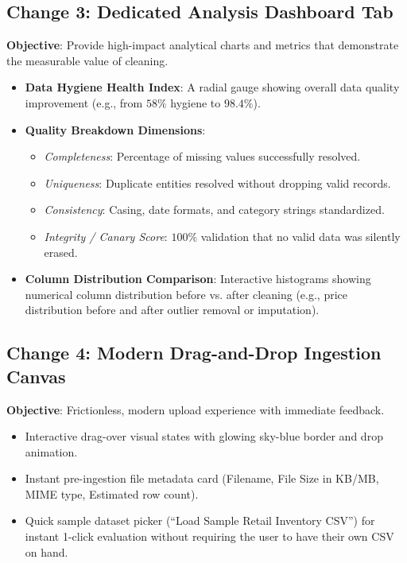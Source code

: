 \documentclass[11pt,a4paper]{article}
\begin{document}
\subsection{Change 3: Dedicated Analysis Dashboard Tab}
\textbf{Objective}: Provide high-impact analytical charts and metrics that demonstrate the measurable value of cleaning.
\begin{itemize}[leftmargin=*]
    \item \textbf{Data Hygiene Health Index}: A radial gauge showing overall data quality improvement (e.g., from $58\%$ hygiene to $98.4\%$).
    \item \textbf{Quality Breakdown Dimensions}:
    \begin{itemize}
        \item \textit{Completeness}: Percentage of missing values successfully resolved.
        \item \textit{Uniqueness}: Duplicate entities resolved without dropping valid records.
        \item \textit{Consistency}: Casing, date formats, and category strings standardized.
        \item \textit{Integrity / Canary Score}: $100\%$ validation that no valid data was silently erased.
    \end{itemize}
    \item \textbf{Column Distribution Comparison}: Interactive histograms showing numerical column distribution before vs. after cleaning (e.g., price distribution before and after outlier removal or imputation).
\end{itemize}

\subsection{Change 4: Modern Drag-and-Drop Ingestion Canvas}
\textbf{Objective}: Frictionless, modern upload experience with immediate feedback.
\begin{itemize}[leftmargin=*]
    \item Interactive drag-over visual states with glowing sky-blue border and drop animation.
    \item Instant pre-ingestion file metadata card (Filename, File Size in KB/MB, MIME type, Estimated row count).
    \item Quick sample dataset picker (``Load Sample Retail Inventory CSV'') for instant 1-click evaluation without requiring the user to have their own CSV on hand.
\end{itemize}
\end{document}
